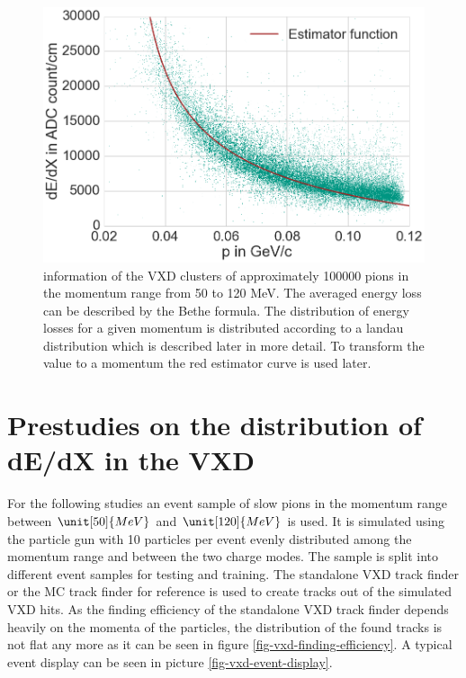 \begin{figure}
 \centering
 \includegraphics[width=0.8\linewidth]{figures/vxd/dedxWithEstimator.png}
 \caption[\dedx information of the VXD clusters.]{\dedx information of the VXD clusters of approximately 100000 pions in the momentum range from 50 to 120 MeV. The averaged energy loss can be described by the Bethe formula. The distribution of energy losses for a given momentum is distributed according to a landau distribution which is described later in more detail. To transform the \dedx value to a momentum the red estimator curve is used later.}
 \label{fig-dedx-over-p}
\end{figure}


\section{Prestudies on the distribution of dE/dX in the VXD}

For the following studies an event sample of slow pions in the momentum range between $\unit[50]{MeV}$ and $\unit[120]{MeV}$ is used. It is simulated using the particle gun with 10 particles per event evenly distributed among the momentum range and between the two charge modes. The sample is split into different event samples for testing and training. The standalone VXD track finder or the MC track finder for reference is used to create tracks out of the simulated VXD hits. As the finding efficiency of the standalone VXD track finder depends heavily on the momenta of the particles, the distribution of the found tracks is not flat any more as it can be seen in figure \ref{fig-vxd-finding-efficiency}. A typical event display can be seen in picture \ref{fig-vxd-event-display}.

